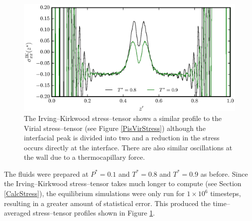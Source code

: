 \begin{figure}[h]
\centering
\includegraphics[scale=0.8]{PisIKStress}
\caption{The Irving--Kirkwood stress--tensor shows a similar profile to the Virial stress--tensor (see Figure \ref{PisVirStress}) although the interfacial peak is divided into two and a reduction in the stress occurs directly at the interface.
There are also similar oscillations at the wall due to a thermocapillary force.}
\label{PisIKStress}
\end{figure}
\FloatBarrier
The fluids were prepared at $P^{*}=0.1$ and $T^{*}=0.8$ and $T^{*}=0.9$ as before.
Since the Irving--Kirkwood stress--tensor takes much longer to compute (see Section \ref{CalcStress}), the equilibrium simulations were only run for $1 \times 10^{6}$ timesteps, resulting in a greater amount of statistical error.
This produced the time--averaged stress--tensor profiles shown in Figure \ref{PisIKStress}.
\FloatBarrier

